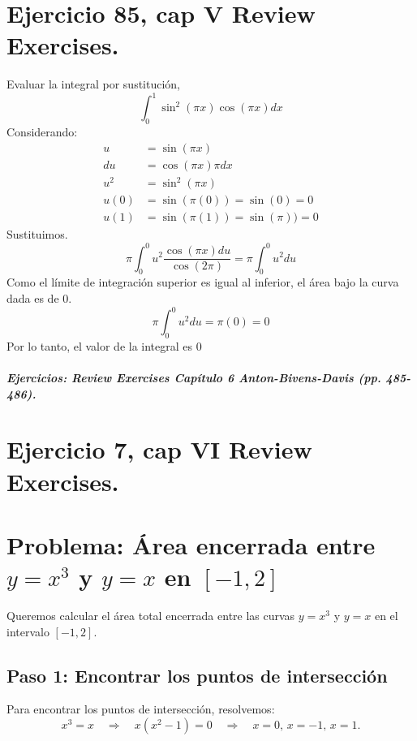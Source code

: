 \documentclass[11pt,letterpaper]{article}
\begin{document}
\section{Ejercicio 85, cap V Review Exercises.}
Evaluar la integral por sustitución,
\begin{equation*}
  \int_0^1\sin^2(\pi x)\cos(\pi x)dx
\end{equation*}
Considerando:
\begin{equation*}
  \begin{split}
    u &= \sin(\pi x)\\
    du &= \cos(\pi x)\pi dx\\
    u^2 &= \sin^2(\pi x)\\
    u(0)&=\sin(\pi (0))=\sin(0)=0\\
    u(1) &= \sin(\pi (1)) = \sin(\pi))=0
  \end{split}
\end{equation*}
Sustituimos.
\begin{equation*}
  \pi \int_0^0u^2 \frac{\cos(\pi x)du}{\cos(2\pi)} = \pi \int_0^0 u^2du
\end{equation*}
Como el límite de integración superior es igual al inferior, el área bajo la curva dada es de 0.
\begin{equation*}
  \pi \int_0^0 u^2du = \pi (0) = 0
\end{equation*}
Por lo tanto, el valor de la integral es 0


\subparagraph{Ejercicios: Review Exercises Capítulo 6 Anton-Bivens-Davis (pp. 485-486).}

\section{Ejercicio 7, cap VI Review Exercises.}
\section*{Problema: Área encerrada entre \( y = x^3 \) y \( y = x \) en \([-1, 2]\)}

Queremos calcular el área total encerrada entre las curvas \( y = x^3 \) y \( y = x \) en el intervalo \([-1, 2]\). 

\subsection*{Paso 1: Encontrar los puntos de intersección}
Para encontrar los puntos de intersección, resolvemos:
\[
x^3 = x \quad \Rightarrow \quad x(x^2 - 1) = 0 \quad \Rightarrow \quad x = 0, \, x = -1, \, x = 1.
\]
\end{document}
